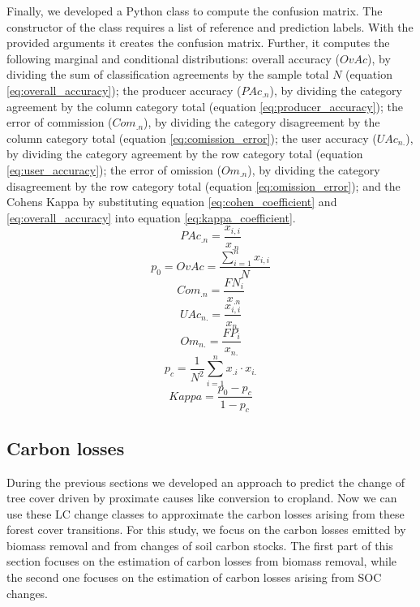 			Finally, we developed a Python class to compute the confusion matrix. The constructor of the class requires a list of reference and prediction labels. With the provided arguments it creates the confusion matrix. Further, it computes the following marginal and conditional distributions: overall accuracy ($OvAc$), by dividing the sum of classification agreements by the sample total $N$ (equation \ref{eq:overall_accuracy}); the producer accuracy ($PAc_{.n}$), by dividing the category agreement by the column category total (equation \ref{eq:producer_accuracy}); the error of commission ($Com_{.n}$), by dividing the category disagreement by the column category total (equation \ref{eq:comission_error}); the user accuracy ($UAc_{n.}$), by dividing the category agreement by the row category total (equation \ref{eq:user_accuracy}); the error of omission ($Om_{.n}$), by dividing the category disagreement by the row category total (equation \ref{eq:omission_error}); and the Cohens Kappa by substituting equation \ref{eq:cohen_coefficient} and \ref{eq:overall_accuracy} into equation \ref{eq:kappa_coefficient}.
			\begin{equation}
			\label{eq:producer_accuracy}
				PAc_{.n} = \frac{x_{i,i}}{x_{.n}}
			\end{equation}
			\begin{equation}
			\label{eq:overall_accuracy}
				p_0=OvAc = \frac{\displaystyle\sum_{i=1}^{n}x_{i,i}}{N}
			\end{equation}
			\begin{equation}
			\label{eq:comission_error}
				Com_{.n} = \frac{FN_i}{x_{.n}}
			\end{equation}
			\begin{equation}
			\label{eq:user_accuracy}
				UAc_{n.} = \frac{x_{i,i}}{x_{n.}}
			\end{equation}
			\begin{equation}
			\label{eq:omission_error}
				Om_{n.} = \frac{FP_i}{x_{n.}}
			\end{equation}
			\begin{equation}
			\label{eq:cohen_coefficient}
				p_c = \frac{1}{N^2}\displaystyle\sum_{i=1}^{n} x_{.i} \cdot x_{i.}
			\end{equation}
			\begin{equation}
			\label{eq:kappa_coefficient}
				Kappa = \frac{p_0-p_c}{1-p_c}
			\end{equation}

	\subsection{Carbon losses}
		During the previous sections we developed an approach to predict the change of tree cover driven by proximate causes like conversion to cropland. Now we can use these \ac{LC} change classes to approximate the carbon losses arising from these forest cover transitions. For this study, we focus on the carbon losses emitted by biomass removal and from changes of soil carbon stocks. The first part of this section focuses on the estimation of carbon losses from biomass removal, while the second one focuses on the estimation of carbon losses arising from \ac{SOC} changes. 

